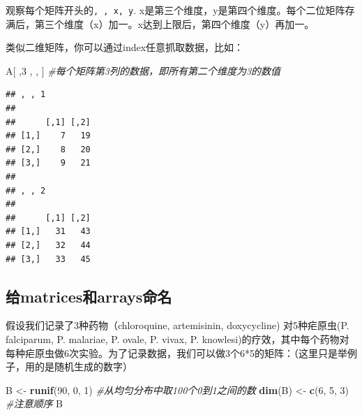 \documentclass[]{book}
\newenvironment{Shaded}{\begin{snugshade}}{\end{snugshade}}
\newcommand{\CommentTok}[1]{\textcolor[rgb]{0.56,0.35,0.01}{\textit{#1}}}
\newcommand{\DecValTok}[1]{\textcolor[rgb]{0.00,0.00,0.81}{#1}}
\newcommand{\KeywordTok}[1]{\textcolor[rgb]{0.13,0.29,0.53}{\textbf{#1}}}
\newcommand{\NormalTok}[1]{#1}
\newcommand{\StringTok}[1]{\textcolor[rgb]{0.31,0.60,0.02}{#1}}
\begin{document}
观察每个矩阵开头的\texttt{,\ ,\ x,\ y}. x是第三个维度，y是第四个维度。每个二位矩阵存满后，第三个维度（x）加一。x达到上限后，第四个维度（y）再加一。

类似二维矩阵，你可以通过index任意抓取数据，比如：

\begin{Shaded}
\begin{Highlighting}[]
\NormalTok{A[ ,}\DecValTok{3}\NormalTok{ , , ] }\CommentTok{#每个矩阵第3列的数据，即所有第二个维度为3的数值}
\end{Highlighting}
\end{Shaded}

\begin{verbatim}
## , , 1
## 
##      [,1] [,2]
## [1,]    7   19
## [2,]    8   20
## [3,]    9   21
## 
## , , 2
## 
##      [,1] [,2]
## [1,]   31   43
## [2,]   32   44
## [3,]   33   45
\end{verbatim}

\hypertarget{matricesarrays}{%
\subsection{给matrices和arrays命名}\label{matricesarrays}}

假设我们记录了3种药物（chloroquine, artemisinin, doxycycline)
对5种疟原虫(P. falciparum, P. malariae, P. ovale, P. vivax, P. knowlesi)的疗效，其中每个药物对每种疟原虫做6次实验。为了记录数据，我们可以做3个6*5的矩阵：（这里只是举例子，用的是随机生成的数字）

\begin{Shaded}
\begin{Highlighting}[]
\NormalTok{B <-}\StringTok{ }\KeywordTok{runif}\NormalTok{(}\DecValTok{90}\NormalTok{, }\DecValTok{0}\NormalTok{, }\DecValTok{1}\NormalTok{) }\CommentTok{#从均匀分布中取100个0到1之间的数}
\KeywordTok{dim}\NormalTok{(B) <-}\StringTok{ }\KeywordTok{c}\NormalTok{(}\DecValTok{6}\NormalTok{, }\DecValTok{5}\NormalTok{, }\DecValTok{3}\NormalTok{) }\CommentTok{#注意顺序}
\NormalTok{B}
\end{Highlighting}
\end{Shaded}
\end{document}
